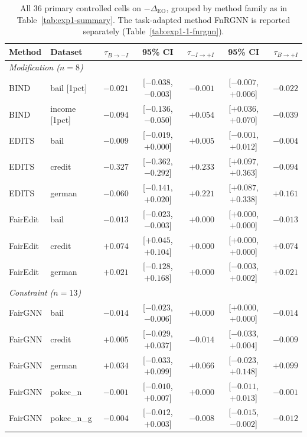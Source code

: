 \begin{table}[t]
\centering
\caption{All 36 primary controlled cells on $-\Delta_{\mathrm{EO}}$, grouped by method family as in Table~\ref{tab:exp1-summary}. The task-adapted method FnRGNN is reported separately (Table~\ref{tab:exp1-1-fnrgnn}).}
\label{tab:exp1-cells-negEO}
\vspace{-0.2cm}
\scriptsize
\begin{tabular}{llrcrcr}
\toprule
Method & Dataset & $\tau_{B\rightarrow -I}$ & 95\% CI & $\tau_{-I\rightarrow +I}$ & 95\% CI & $\tau_{B\rightarrow +I}$ \\
\midrule
\multicolumn{7}{l}{\textit{Modification ($n=8$)}} \\
BIND & bail [1pct] & $-0.021$ & [$-0.038$, $-0.003$] & $-0.001$ & [$-0.007$, $+0.006$] & $-0.022$ \\
BIND & income [1pct] & $-0.094$ & [$-0.136$, $-0.050$] & $\mathbf{+0.054}$ & [$+0.036$, $+0.070$] & $-0.039$ \\
\midrule
EDITS & bail & $-0.009$ & [$-0.019$, $+0.000$] & $+0.005$ & [$-0.001$, $+0.012$] & $-0.004$ \\
EDITS & credit & $-0.327$ & [$-0.362$, $-0.292$] & $\mathbf{+0.233}$ & [$+0.097$, $+0.363$] & $-0.094$ \\
EDITS & german & $-0.060$ & [$-0.141$, $+0.020$] & $\mathbf{+0.221}$ & [$+0.087$, $+0.338$] & $+0.161$ \\
\midrule
FairEdit & bail & $-0.013$ & [$-0.023$, $-0.003$] & $+0.000$ & [$+0.000$, $+0.000$] & $-0.013$ \\
FairEdit & credit & $+0.074$ & [$+0.045$, $+0.104$] & $+0.000$ & [$+0.000$, $+0.000$] & $+0.074$ \\
FairEdit & german & $+0.021$ & [$-0.128$, $+0.168$] & $+0.000$ & [$-0.003$, $+0.002$] & $+0.021$ \\
\midrule
\multicolumn{7}{l}{\textit{Constraint ($n=13$)}} \\
FairGNN & bail & $-0.014$ & [$-0.023$, $-0.006$] & $+0.000$ & [$+0.000$, $+0.000$] & $-0.014$ \\
FairGNN & credit & $+0.005$ & [$-0.029$, $+0.037$] & $-0.014$ & [$-0.033$, $+0.004$] & $-0.009$ \\
FairGNN & german & $+0.034$ & [$-0.033$, $+0.099$] & $+0.066$ & [$-0.023$, $+0.148$] & $+0.099$ \\
FairGNN & pokec\_n & $-0.001$ & [$-0.010$, $+0.007$] & $+0.000$ & [$-0.011$, $+0.013$] & $-0.001$ \\
FairGNN & pokec\_n\_g & $-0.004$ & [$-0.012$, $+0.003$] & $-0.008$ & [$-0.015$, $-0.002$] & $-0.012$ \\

\end{tabular}
\end{table}
